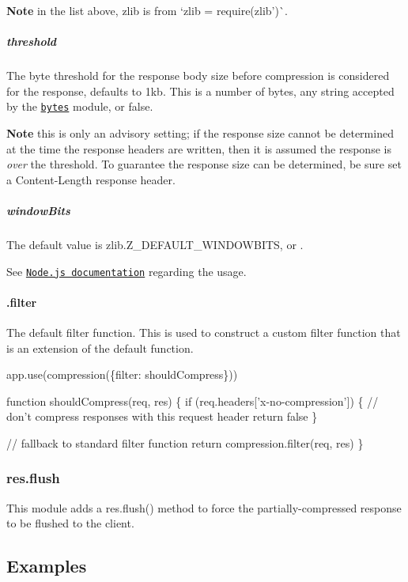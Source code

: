 {\bfseries Note} in the list above, {\ttfamily zlib} is from `zlib = require(\textquotesingle{}zlib')\`{}.

\subparagraph*{threshold}

The byte threshold for the response body size before compression is considered for the response, defaults to {\ttfamily 1kb}. This is a number of bytes, any string accepted by the \href{https://www.npmjs.com/package/bytes}{\tt bytes} module, or {\ttfamily false}.

{\bfseries Note} this is only an advisory setting; if the response size cannot be determined at the time the response headers are written, then it is assumed the response is {\itshape over} the threshold. To guarantee the response size can be determined, be sure set a {\ttfamily Content-\/\+Length} response header.

\subparagraph*{window\+Bits}

The default value is {\ttfamily zlib.\+Z\+\_\+\+D\+E\+F\+A\+U\+L\+T\+\_\+\+W\+I\+N\+D\+O\+W\+B\+I\+TS}, or {}.

See \href{http://nodejs.org/api/zlib.html#zlib_memory_usage_tuning}{\tt Node.\+js documentation} regarding the usage.

\paragraph*{.filter}

The default {\ttfamily filter} function. This is used to construct a custom filter function that is an extension of the default function.


\begin{DoxyCode}
app.use(compression(\{filter: shouldCompress\}))

function shouldCompress(req, res) \{
  if (req.headers['x-no-compression']) \{
    // don't compress responses with this request header
    return false
  \}

  // fallback to standard filter function
  return compression.filter(req, res)
\}
\end{DoxyCode}


\subsubsection*{res.\+flush}

This module adds a {\ttfamily res.\+flush()} method to force the partially-\/compressed response to be flushed to the client.

\subsection*{Examples}

